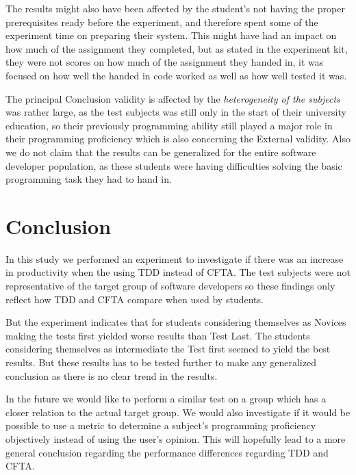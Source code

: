 \documentclass{sig-alternate-05-2015}
\begin{document}
The results might also have been affected by the student's not having the proper prerequisites ready before the experiment, and therefore spent some of the experiment time on preparing their system. This might have had an impact on how much of the assignment they completed, but as stated in the experiment kit, they were not scores on how much of the assignment they handed in, it was focused on how well the handed in code worked as well as how well tested it was.

The principal Conclusion validity is affected by the \textit{heterogeneity of the subjects} was rather large, as the test subjects was still only in the start of their university education, so their previously programming ability still played a major role in their programming proficiency which is also concerning the External validity. Also we do not claim that the results can be generalized for the entire software developer population, as these students were having difficulties solving the basic programming task they had to hand in. 


\section{Conclusion}
In this study we performed an experiment to investigate if there was an increase in productivity when the using TDD instead of CFTA. The test subjects were not representative of the target group of software developers so these findings only reflect how TDD and CFTA compare when used by students. 

But the experiment indicates that for students considering themselves as Novices making the tests first yielded worse results than Test Last. The students considering themselves as intermediate the Test first seemed to yield the best results. But these results has to be tested further to make any generalized conclusion as there is no clear trend in the results.

In the future we would like to perform a similar test on a group which has a closer relation to the actual target group. We would also investigate if it would be possible to use a metric to determine a subject's programming proficiency objectively instead of using the user's opinion. This will hopefully lead to a more general conclusion regarding the performance differences regarding TDD and CFTA.
\end{document}
